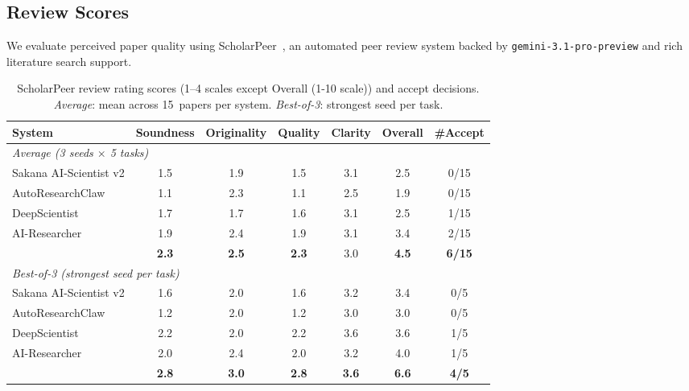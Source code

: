 
\subsection{Review Scores}
\label{sec:exp:reviews}

We evaluate perceived paper quality using ScholarPeer~\citep{goyal2026scholarpeer}, an automated peer review system backed by \texttt{gemini-3.1-pro-preview} and rich literature search support.

\begin{table}[h]
\centering
\small
\caption{ScholarPeer review rating scores (1--4 scales except Overall (1-10 scale)) and accept decisions. \emph{Average}: mean across 15~papers per system. \emph{Best-of-3}: strongest seed per task.}
\label{tab:reviews}
\begin{tabular}{@{}lcccccc@{}}
\toprule
\textbf{System} & \textbf{Soundness} & \textbf{Originality} & \textbf{Quality} & \textbf{Clarity} & \textbf{Overall} & \textbf{\#Accept} \\
\midrule
\multicolumn{7}{l}{\textit{Average (3 seeds $\times$ 5 tasks)}} \\
Sakana AI-Scientist v2    & 1.5 & 1.9 & 1.5 & 3.1 & 2.5 & 0/15 \\
AutoResearchClaw            & 1.1 & 2.3 & 1.1 & 2.5 & 1.9 & 0/15 \\
DeepScientist             & 1.7 & 1.7 & 1.6 & 3.1 & 2.5 & 1/15 \\
AI-Researcher            & 1.9 & 2.4 & 1.9 & 3.1 & 3.4 & 2/15 \\
\sys{}         & \textbf{2.3} & \textbf{2.5} & \textbf{2.3} & 3.0 & \textbf{4.5} & \textbf{6/15} \\
\midrule
\multicolumn{7}{l}{\textit{Best-of-3 (strongest seed per task)}} \\
Sakana AI-Scientist v2    & 1.6 & 2.0 & 1.6 & 3.2 & 3.4 & 0/5 \\
AutoResearchClaw            & 1.2 & 2.0 & 1.2 & 3.0 & 3.0 & 0/5 \\
DeepScientist             & 2.2 & 2.0 & 2.2 & 3.6 & 3.6 & 1/5 \\
AI-Researcher            & 2.0 & 2.4 & 2.0 & 3.2 & 4.0 & 1/5 \\
\sys{}         & \textbf{2.8} & \textbf{3.0} & \textbf{2.8} & \textbf{3.6} & \textbf{6.6} & \textbf{4/5} \\
\bottomrule
\end{tabular}
\end{table}



